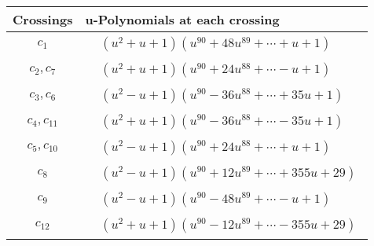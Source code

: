 \documentclass[1p]{elsarticle_modified}
\theoremstyle{definition}
\begin{document}
\begin{tabular}{m{50pt}|m{274pt}}
Crossings & \hspace{64pt}u-Polynomials at each crossing \\
\hline $$\begin{aligned}c_{1}\end{aligned}$$&$\begin{aligned}
&(u^2+u+1)(u^{90}+48 u^{89}+\cdots+u+1)
\end{aligned}$\\
\hline $$\begin{aligned}c_{2},c_{7}\end{aligned}$$&$\begin{aligned}
&(u^2+u+1)(u^{90}+24 u^{88}+\cdots- u+1)
\end{aligned}$\\
\hline $$\begin{aligned}c_{3},c_{6}\end{aligned}$$&$\begin{aligned}
&(u^2- u+1)(u^{90}-36 u^{88}+\cdots+35 u+1)
\end{aligned}$\\
\hline $$\begin{aligned}c_{4},c_{11}\end{aligned}$$&$\begin{aligned}
&(u^2+u+1)(u^{90}-36 u^{88}+\cdots-35 u+1)
\end{aligned}$\\
\hline $$\begin{aligned}c_{5},c_{10}\end{aligned}$$&$\begin{aligned}
&(u^2- u+1)(u^{90}+24 u^{88}+\cdots+u+1)
\end{aligned}$\\
\hline $$\begin{aligned}c_{8}\end{aligned}$$&$\begin{aligned}
&(u^2- u+1)(u^{90}+12 u^{89}+\cdots+355 u+29)
\end{aligned}$\\
\hline $$\begin{aligned}c_{9}\end{aligned}$$&$\begin{aligned}
&(u^2- u+1)(u^{90}-48 u^{89}+\cdots- u+1)
\end{aligned}$\\
\hline $$\begin{aligned}c_{12}\end{aligned}$$&$\begin{aligned}
&(u^2+u+1)(u^{90}-12 u^{89}+\cdots-355 u+29)
\end{aligned}$\\
\hline
\end{tabular}\newpage\renewcommand{\arraystretch}{1}
\end{document}
